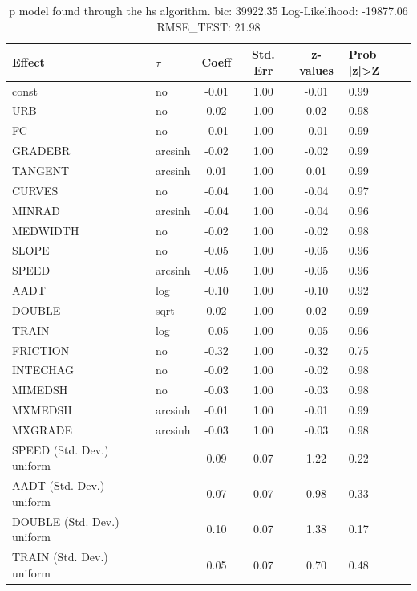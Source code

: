 \begin{table}
	\caption{p model found through the hs algorithm. bic: 39922.35 Log-Likelihood: -19877.06 RMSE_TEST: 21.98}
	\begin{center}
		\begin{tabular}{|l|l|c|c|c|l|}
			\hline
			Effect & $\tau$ & Coeff & Std. Err & z-values & Prob |z|>Z \\
			\hline
			const & no & -0.01 & 1.00 & -0.01 & 0.99 \\
			\hline
			URB & no & 0.02 & 1.00 & 0.02 & 0.98 \\
			\hline
			FC & no & -0.01 & 1.00 & -0.01 & 0.99 \\
			\hline
			GRADEBR & arcsinh & -0.02 & 1.00 & -0.02 & 0.99 \\
			\hline
			TANGENT & arcsinh & 0.01 & 1.00 & 0.01 & 0.99 \\
			\hline
			CURVES & no & -0.04 & 1.00 & -0.04 & 0.97 \\
			\hline
			MINRAD & arcsinh & -0.04 & 1.00 & -0.04 & 0.96 \\
			\hline
			MEDWIDTH & no & -0.02 & 1.00 & -0.02 & 0.98 \\
			\hline
			SLOPE & no & -0.05 & 1.00 & -0.05 & 0.96 \\
			\hline
			SPEED & arcsinh & -0.05 & 1.00 & -0.05 & 0.96 \\
			\hline
			AADT & log & -0.10 & 1.00 & -0.10 & 0.92 \\
			\hline
			DOUBLE & sqrt & 0.02 & 1.00 & 0.02 & 0.99 \\
			\hline
			TRAIN & log & -0.05 & 1.00 & -0.05 & 0.96 \\
			\hline
			FRICTION & no & -0.32 & 1.00 & -0.32 & 0.75 \\
			\hline
			INTECHAG & no & -0.02 & 1.00 & -0.02 & 0.98 \\
			\hline
			MIMEDSH & no & -0.03 & 1.00 & -0.03 & 0.98 \\
			\hline
			MXMEDSH & arcsinh & -0.01 & 1.00 & -0.01 & 0.99 \\
			\hline
			MXGRADE & arcsinh & -0.03 & 1.00 & -0.03 & 0.98 \\
			\hline
			SPEED (Std. Dev.) uniform &  & 0.09 & 0.07 & 1.22 & 0.22 \\
			\hline
			AADT (Std. Dev.) uniform &  & 0.07 & 0.07 & 0.98 & 0.33 \\
			\hline
			DOUBLE (Std. Dev.) uniform &  & 0.10 & 0.07 & 1.38 & 0.17 \\
			\hline
			TRAIN (Std. Dev.) uniform &  & 0.05 & 0.07 & 0.70 & 0.48 \\

\end{tabular}
\end{center}
\end{table}

